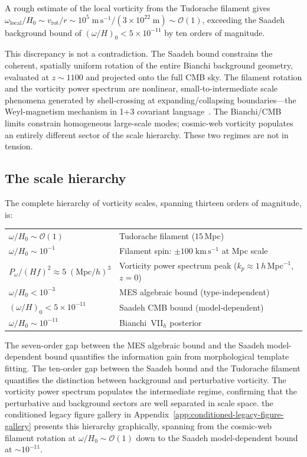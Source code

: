A rough estimate of the local vorticity from the Tudorache
filament gives $\omega_{\mathrm{local}}/H_0 \sim
v_{\mathrm{rot}}/r
\sim 10^5\;\mathrm{m\,s^{-1}}/(3 \times 10^{22}\;\mathrm{m})
\sim \mathcal{O}(1)$, exceeding the Saadeh background bound of
$(\omega/H)_0 < 5 \times 10^{-11}$ by ten orders of magnitude.

This discrepancy is not a contradiction.  The Saadeh bound
constrains the coherent, spatially uniform rotation of the
entire Bianchi background geometry, evaluated at
$z \sim 1100$ and projected onto the full CMB sky.  The
filament rotation and the vorticity power spectrum are
nonlinear, small-to-intermediate scale phenomena generated by
shell-crossing at expanding/collapsing boundaries---the
Weyl-magnetism mechanism in 1+3 covariant
language~\cite{Umeh2023}.  The Bianchi/CMB limits constrain
homogeneous large-scale modes; cosmic-web vorticity populates
an entirely different sector of the scale hierarchy.
These two regimes are not in tension.


\subsection{The scale hierarchy}
\label{rem:scale-hierarchy}

The complete hierarchy of vorticity scales, spanning thirteen
orders of magnitude, is:
\begin{center}\footnotesize
\begin{tabular}{ll}
\toprule
$\omega/H_0 \sim \mathcal{O}(1)$ &
  Tudorache filament ($15\,$Mpc) \\
$\omega/H_0 \sim 10^{-1}$ &
  Filament spin: $\pm 100\;\mathrm{km\,s^{-1}}$ at Mpc scale \\
$P_\omega/(Hf)^2 \approx 5\;(\mathrm{Mpc}/h)^3$ &
  Vorticity power spectrum peak ($k_p \approx 1\,h\,$Mpc$^{-1}$, $z = 0$) \\
$\omega/H_0 < 10^{-3}$ &
  MES algebraic bound (type-independent) \\
$(\omega/H)_0 < 5 \times 10^{-11}$ &
  Saadeh CMB bound (model-dependent) \\
$\omega/H_0 \sim 10^{-11}$ &
  Bianchi~VII$_h$ posterior \\
\bottomrule
\end{tabular}
\end{center}
The seven-order gap between the MES algebraic bound and the
Saadeh model-dependent bound quantifies the information gain
from morphological template fitting.  The ten-order gap between
the Saadeh bound and the Tudorache filament quantifies the
distinction between background and perturbative vorticity.
The vorticity power spectrum populates the intermediate regime,
confirming that the perturbative and background sectors are
well separated in scale space.
the conditioned legacy figure gallery in Appendix~\ref{app:conditioned-legacy-figure-gallery} presents this hierarchy graphically,
spanning from the cosmic-web filament rotation at $\omega/H_0 \sim
\mathcal{O}(1)$ down to the Saadeh model-dependent bound at
$\sim 10^{-11}$.


